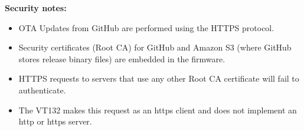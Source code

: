 \textbf{Security notes:}

\begin{itemize}[leftmargin=1em]
 \item OTA Updates from GitHub are performed using the HTTPS protocol.
 \item Security certificates (Root CA) for GitHub and Amazon S3 (where GitHub stores release binary files) are embedded in the firmware.
 \item HTTPS requests to servers that use any other Root CA certificate will fail to authenticate.
 \item The VT132 makes this request as an https client and does not implement an http or https server.
\end{itemize}

%

